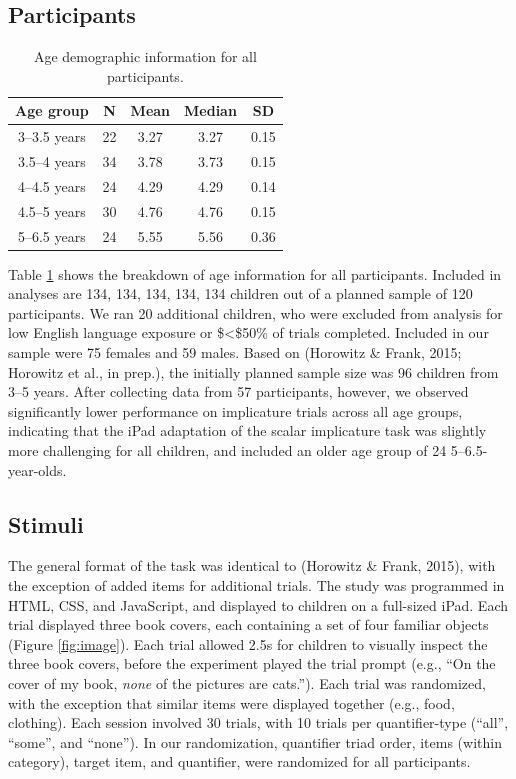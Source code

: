 \documentclass[10pt, letterpaper]{article}
\begin{document}
\subsection{Participants}\label{participants}

\begin{table}
\centering
\begin{tabular}{c c c c c } 
 \hline
 Age group & N & Mean & Median & SD \\
 \hline
 3--3.5 years & 22 & 3.27 & 3.27 & 0.15\\
 \hline
 3.5--4 years & 34 & 3.78 & 3.73 & 0.15 \\ 
 \hline
 4--4.5 years & 24 & 4.29 & 4.29 & 0.14\\
 \hline
 4.5--5 years & 30 & 4.76 & 4.76 & 0.15 \\
 \hline
 5--6.5 years & 24 & 5.55 & 5.56 & 0.36 \\
 \hline
\end{tabular}
\caption{Age demographic information for all participants.}
\label{tab:age}
\end{table}

Table \ref{tab:age} shows the breakdown of age information for all
participants. Included in analyses are 134, 134, 134, 134, 134 children
out of a planned sample of 120 participants. We ran 20 additional
children, who were excluded from analysis for low English language
exposure or \$\textless{}\$50\% of trials completed. Included in our
sample were 75 females and 59 males. Based on (Horowitz \& Frank, 2015;
Horowitz et al., in prep.), the initially planned sample size was 96
children from 3--5 years. After collecting data from 57 participants,
however, we observed significantly lower performance on implicature
trials across all age groups, indicating that the iPad adaptation of the
scalar implicature task was slightly more challenging for all children,
and included an older age group of 24 5--6.5-year-olds.

\subsection{Stimuli}\label{stimuli}

The general format of the task was identical to (Horowitz \& Frank,
2015), with the exception of added items for additional trials. The
study was programmed in HTML, CSS, and JavaScript, and displayed to
children on a full-sized iPad. Each trial displayed three book covers,
each containing a set of four familiar objects (Figure \ref{fig:image}).
Each trial allowed 2.5s for children to visually inspect the three book
covers, before the experiment played the trial prompt (e.g., ``On the
cover of my book, \emph{none} of the pictures are cats.''). Each trial
was randomized, with the exception that similar items were displayed
together (e.g., food, clothing). Each session involved 30 trials, with
10 trials per quantifier-type (``all'', ``some'', and ``none''). In our
randomization, quantifier triad order, items (within category), target
item, and quantifier, were randomized for all participants.
\end{document}
